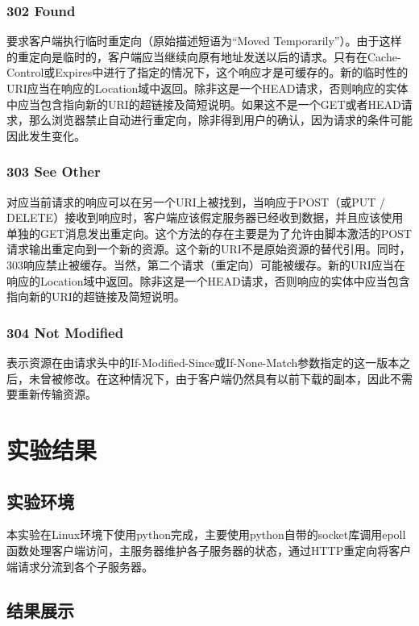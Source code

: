 \documentclass{article}
\begin{document}
\subsubsection{302 Found}
要求客户端执行临时重定向（原始描述短语为“Moved Temporarily”）。由于这样的重定向是临时的，客户端应当继续向原有地址发送以后的请求。只有在Cache-Control或Expires中进行了指定的情况下，这个响应才是可缓存的。新的临时性的URI应当在响应的Location域中返回。除非这是一个HEAD请求，否则响应的实体中应当包含指向新的URI的超链接及简短说明。如果这不是一个GET或者HEAD请求，那么浏览器禁止自动进行重定向，除非得到用户的确认，因为请求的条件可能因此发生变化。

\subsubsection{303 See Other}
对应当前请求的响应可以在另一个URI上被找到，当响应于POST（或PUT / DELETE）接收到响应时，客户端应该假定服务器已经收到数据，并且应该使用单独的GET消息发出重定向。这个方法的存在主要是为了允许由脚本激活的POST请求输出重定向到一个新的资源。这个新的URI不是原始资源的替代引用。同时，303响应禁止被缓存。当然，第二个请求（重定向）可能被缓存。新的URI应当在响应的Location域中返回。除非这是一个HEAD请求，否则响应的实体中应当包含指向新的URI的超链接及简短说明。

\subsubsection{304 Not Modified}
表示资源在由请求头中的If-Modified-Since或If-None-Match参数指定的这一版本之后，未曾被修改。在这种情况下，由于客户端仍然具有以前下载的副本，因此不需要重新传输资源。

\section{实验结果}
\subsection{实验环境}
本实验在Linux环境下使用python完成，主要使用python自带的socket库调用epoll函数处理客户端访问，主服务器维护各子服务器的状态，通过HTTP重定向将客户端请求分流到各个子服务器。

\subsection{结果展示}
\end{document}
